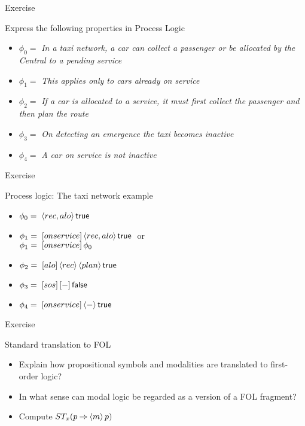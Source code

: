 \documentclass{beamer}
\begin{document}
\begin{slide}{Exercise}\label{s:26}
\small
\begin{exampleblock}{Express the following properties in Process Logic}
\begin{itemize}
\item $\phi_0 =$ \emph{In a taxi network, a car can collect a passenger or be allocated by the Central to a pending service}
\item $\phi_1 =$ \emph{This applies only to cars already on service}
\item $\phi_2 =$
 \emph{If a car is allocated to a service, it must first collect the passenger and then plan the route}
\item $\phi_3 =$ \emph{On detecting an emergence the taxi becomes inactive}
\item $\phi_4 =$ \emph{A car on service is not inactive}
\end{itemize}
\end{exampleblock}
\end{slide}

\begin{slide}{Exercise}\label{s:27}
\small
\begin{exampleblock}{Process logic: The taxi network example}
\begin{itemize}
\item $\phi_0 =\; \langle rec,alo \rangle\, \mathsf{true}$ 
\item $\phi_1 =\;  [onservice]\, \langle rec,alo \rangle\, \mathsf{true}\; $ or\\
$\phi_1 =\;   [onservice]\, \phi_0$
\item $\phi_2 =\;  [alo]\, \langle rec \rangle\, \langle plan \rangle\, \mathsf{true}$
\item $\phi_3 =\;  [sos]\, [-]\, \mathsf{false}$
\item $\phi_4 =\;  [onservice]\, \langle - \rangle\, \mathsf{true}$
\end{itemize}
\end{exampleblock}
\end{slide}


\begin{slide}{Exercise}\label{s:28}
\small
\begin{exampleblock}{Standard translation to FOL}
\begin{itemize}
\item Explain how propositional symbols and modalities are translated to first-order logic?
\item In what sense can modal logic be regarded as a  version of a FOL fragment?
\item Compute  $ST_x (p \mathbin{\Rightarrow} \langle m \rangle\, p)$ 
\end{itemize}
\end{exampleblock}
\end{slide}
\end{document}
